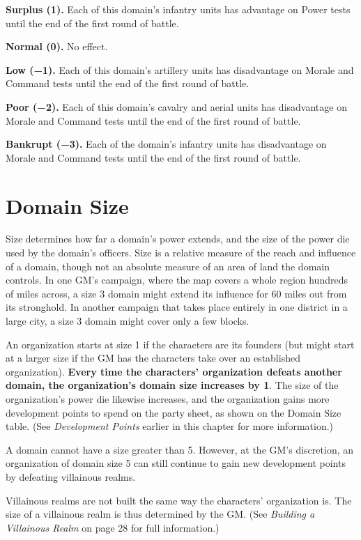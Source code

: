 \documentclass[10pt,a4paper,twoside,bg=print,twocolumn,openany,nodeprecatedcode]{dndbook}
\begin{document}
\textbf{Surplus (1).} Each of this domain's infantry units has advantage on Power tests until the end of the first round of battle.

\textbf{Normal (0).} No effect.

\textbf{Low (−1).} Each of this domain's artillery units has disadvantage on Morale and Command tests until the end of the first round of battle.

\textbf{Poor (−2).} Each of this domain's cavalry and aerial units has disadvantage on Morale and Command tests until the end of the first round of battle.

\textbf{Bankrupt (−3).} Each of the domain's infantry units has disadvantage on Morale and Command tests until the end of the first round of battle.

\section{Domain Size}
Size determines how far a domain's power extends, and the size of the power die used by the domain's officers. Size is a relative measure of the reach and influence of a domain, though not an absolute measure of an area of land the domain controls. In one GM's campaign, where the map covers a whole region hundreds of miles across, a size 3 domain might extend its influence for 60 miles out from its stronghold. In another campaign that takes place entirely in one district in a large city, a size 3 domain might cover only a few blocks.

An organization starts at size 1 if the characters are its founders (but might start at a larger size if the GM has the characters take over an established organization). \textbf{Every time the characters' organization defeats another domain, the organization's domain size increases by 1}. The size of the organization's power die likewise increases, and the organization gains more development points to spend on the party sheet, as shown on the Domain Size table. (See \textit{Development Points} earlier in this chapter for more information.)

A domain cannot have a size greater than 5. However, at the GM's discretion, an organization of domain size 5 can still continue to gain new development points by defeating villainous realms.

Villainous realms are not built the same way the characters' organization is. The size of a villainous realm is thus determined by the GM. (See \textit{Building a Villainous Realm} on page 28 for full information.)
\end{document}
